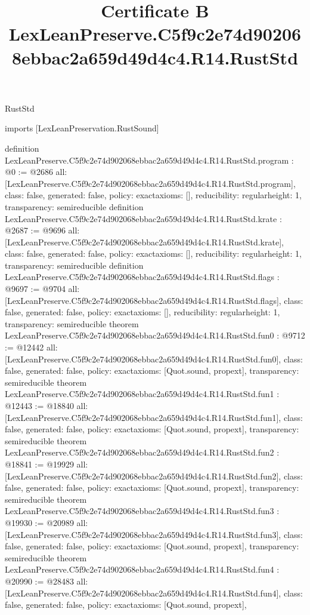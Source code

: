 \begin{lexlean}{RustStd}
\title{Certificate B LexLeanPreserve.C5f9c2e74d902068ebbac2a659d49d4c4.R14.RustStd}
\begin{coremodule}
imports [LexLeanPreservation.RustSound]

definition LexLeanPreserve.C5f9c2e74d902068ebbac2a659d49d4c4.R14.RustStd.program : @0 := @2686 {
  all: [LexLeanPreserve.C5f9c2e74d902068ebbac2a659d49d4c4.R14.RustStd.program],
  class: false,
  generated: false,
  policy: exact{axioms: []},
  reducibility: regular{height: 1},
  transparency: semireducible
}
definition LexLeanPreserve.C5f9c2e74d902068ebbac2a659d49d4c4.R14.RustStd.krate : @2687 := @9696 {
  all: [LexLeanPreserve.C5f9c2e74d902068ebbac2a659d49d4c4.R14.RustStd.krate],
  class: false,
  generated: false,
  policy: exact{axioms: []},
  reducibility: regular{height: 1},
  transparency: semireducible
}
definition LexLeanPreserve.C5f9c2e74d902068ebbac2a659d49d4c4.R14.RustStd.flags : @9697 := @9704 {
  all: [LexLeanPreserve.C5f9c2e74d902068ebbac2a659d49d4c4.R14.RustStd.flags],
  class: false,
  generated: false,
  policy: exact{axioms: []},
  reducibility: regular{height: 1},
  transparency: semireducible
}
theorem LexLeanPreserve.C5f9c2e74d902068ebbac2a659d49d4c4.R14.RustStd.fun0 : @9712 := @12442 {
  all: [LexLeanPreserve.C5f9c2e74d902068ebbac2a659d49d4c4.R14.RustStd.fun0],
  class: false,
  generated: false,
  policy: exact{axioms: [Quot.sound, propext]},
  transparency: semireducible
}
theorem LexLeanPreserve.C5f9c2e74d902068ebbac2a659d49d4c4.R14.RustStd.fun1 : @12443 := @18840 {
  all: [LexLeanPreserve.C5f9c2e74d902068ebbac2a659d49d4c4.R14.RustStd.fun1],
  class: false,
  generated: false,
  policy: exact{axioms: [Quot.sound, propext]},
  transparency: semireducible
}
theorem LexLeanPreserve.C5f9c2e74d902068ebbac2a659d49d4c4.R14.RustStd.fun2 : @18841 := @19929 {
  all: [LexLeanPreserve.C5f9c2e74d902068ebbac2a659d49d4c4.R14.RustStd.fun2],
  class: false,
  generated: false,
  policy: exact{axioms: [Quot.sound, propext]},
  transparency: semireducible
}
theorem LexLeanPreserve.C5f9c2e74d902068ebbac2a659d49d4c4.R14.RustStd.fun3 : @19930 := @20989 {
  all: [LexLeanPreserve.C5f9c2e74d902068ebbac2a659d49d4c4.R14.RustStd.fun3],
  class: false,
  generated: false,
  policy: exact{axioms: [Quot.sound, propext]},
  transparency: semireducible
}
theorem LexLeanPreserve.C5f9c2e74d902068ebbac2a659d49d4c4.R14.RustStd.fun4 : @20990 := @28483 {
  all: [LexLeanPreserve.C5f9c2e74d902068ebbac2a659d49d4c4.R14.RustStd.fun4],
  class: false,
  generated: false,
  policy: exact{axioms: [Quot.sound, propext]},
}
\end{coremodule}
\end{lexlean}
